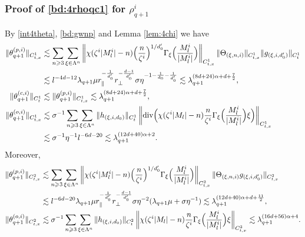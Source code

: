 \documentclass[UTF-8,reqno]{amsart}
\numberwithin{equation}{section}
\theoremstyle{definition}
\def\({{\Big(}}
\def\){{\Big)}}
\newcommand{\norm}[1]{\left\|#1\right\|}
\def\geq{\geqslant}
\def\div{\mathord{{\rm div}}}
\def\({{\Big(}}
\def\){{\Big)}}
\def\geq{\geqslant}
\def\div{\mathord{{\rm div}}}
\begin{document}
\subsubsection{Proof of  \eqref{bd:4rhoqc1} for $\rho^{i}_{q+1}$}
  By \eqref{int4theta}, \eqref{bd:gwnp} and Lemma \ref{lem:4chi} we have
\begin{align*}
\|\theta_{q+1}^{(p,i)} \|_{C_{t,x}^1} 
&\lesssim\sum_{n\geq3}\sum_{\xi\in\Lambda^{n}}\norm{\chi(\zeta^{i}|M^{i}_l|-n)\(\frac{n}{\zeta^{i}}\)^{1/d_0'}\Gamma_{\xi}\(\frac{M^{i}_l}{|M^{i}_l|}\)}_{C_{t,x}^1}\|\Theta_{(\xi,n,i)} \|_{C_{t,x}^1}\|g_{(\xi,i,d_0')}\|_{C_t^1}\notag\\ 
&\lesssim l^{-4d-12}\lambda_{q+1}\mu r_\parallel^{-\frac{1}{d_0'}}r_\perp^{-\frac{d-1}{d_0'}}\sigma\eta^{-1-\frac{1}{d_0}-\frac{1}{d_0'}}\lesssim
\lambda_{q+1}^{(8d+24)\alpha+d+\frac{7}{2}},\notag\\
\|\theta_{q+1}^{(c,i)}\|_{C_{t}^1}&\lesssim\|\theta_{q+1}^{(p,i)} \|_{C_{t,x}^1}\lesssim 
\lambda_{q+1}^{(8d+24)\alpha+d+\frac{7}{2}},\notag\\
     \|   \theta_{q+1}^{(o,i)}\|_{C_{t,x}^1}&\lesssim \sigma^{-1}\sum_{n\geq3}\sum_{\xi\in\Lambda^{n}}\|h_{(\xi,i,d_0)}\|_{C_t^1}\norm{\div\(\chi(\zeta^i|M_l|-n)\frac{n}{\zeta^i}\Gamma_{\xi}\(\frac{M_l^i}{|M_l^i|}\)\xi\)}_{C_{t,x}^1}\\ 
     &\lesssim \sigma^{-1}\eta^{-1} l^{-6d-20}\lesssim \lambda_{q+1}^{(12d+40)\alpha+2}.\notag
\end{align*}
Moreover, 
\begin{align*}
    \|\theta_{q+1}^{(p,i)} \|_{C_{t,x}^2}
&\lesssim\sum_{n\geq3}\sum_{\xi\in\Lambda^{n}}\norm{\chi(\zeta^{i}|M^{i}_l|-n)\(\frac{n}{\zeta^{i}}\)^{1/d_0'}\Gamma_{\xi}\(\frac{M^{i}_l}{|M^{i}_l|}\)}_{C_{t,x}^2}\| \Theta_{(\xi,n,i)} g_{(\xi,i,d_0')}\|_{C_{t,x}^2}\notag\\ 
&\lesssim l^{-6d-20}\lambda_{q+1}\mu r_\parallel^{-\frac{1}{d_0'}}r_\perp^{-\frac{d-1}{d_0'}}\sigma\eta^{-2}(\lambda_{q+1}\mu+\sigma\eta^{-1})\lesssim
\lambda_{q+1}^{(12d+40)\alpha+d+\frac{11}{2}},\notag\\
   \|    \theta_{q+1}^{(o,i)}\|_{C_{t,x}^2}&\lesssim \sigma^{-1}\sum_{n\geq3}\sum_{\xi\in\Lambda^{n}}\|h_{(\xi,i,d_0)}\|_{C_t^2}\norm{\chi(\zeta^i|M_l|-n)\frac{n}{\zeta^i}\Gamma_{\xi}\(\frac{M_l^i}{|M_l^i|}\)\xi}_{C_{t,x}^3}
       \lesssim \lambda_{q+1}^{(16d+56)\alpha+4}.\notag
\end{align*}
\end{document}
